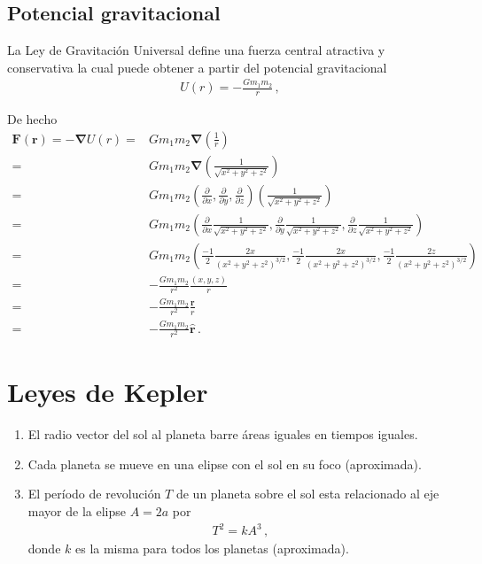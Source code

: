 \subsection{Potencial gravitacional}
\begin{frame}
La Ley de Gravitación Universal define una fuerza central atractiva y conservativa la cual puede obtener a partir del potencial gravitacional
\begin{align*}
  U(r)=-\frac{Gm_1m_2}{r}\,,
\end{align*}
\end{frame}

De hecho 
\begin{align*}
\mathbf{F}(\mathbf{r})=-\boldsymbol{\nabla}U(r)
=&Gm_1m_2\boldsymbol{\nabla}\left(\frac{1}{r}\right)\nonumber\\
=&Gm_1m_2\boldsymbol{\nabla}\left(\frac{1}{\sqrt{x^2+y^2+z^2}}\right)\nonumber\\
=&Gm_1m_2\left(\frac{\partial}{\partial x},\frac{\partial}{\partial y},\frac{\partial}{\partial z}\right)\left(\frac{1}{\sqrt{x^2+y^2+z^2}}\right)\nonumber\\
=&Gm_1m_2\left(\frac{\partial}{\partial x}\frac{1}{\sqrt{x^2+y^2+z^2}},\frac{\partial}{\partial y}\frac{1}{\sqrt{x^2+y^2+z^2}},\frac{\partial}{\partial z}\frac{1}{\sqrt{x^2+y^2+z^2}}\right)\nonumber\\
=&Gm_1m_2\left(\frac{-1}{2}\frac{2x}{(x^2+y^2+z^2)^{3/2}},\frac{-1}{2}\frac{2x}{(x^2+y^2+z^2)^{3/2}},\frac{-1}{2}\frac{2z}{(x^2+y^2+z^2)^{3/2}}\right)\nonumber\\
=&-\frac{Gm_1m_2}{r^2}\frac{(x,y,z)}{r}\nonumber\\
=&-\frac{Gm_1m_2}{r^2}\frac{\mathbf{r}}{r}\nonumber\\
=&-\frac{Gm_1m_2}{r^2}\hat{\mathbf{r}}\,.
\end{align*}


\section{Leyes de Kepler}

\begin{frame}
\begin{enumerate}
\item El radio vector del sol al planeta barre áreas iguales en tiempos iguales.
\item Cada planeta se mueve en una elipse con el sol en su foco (aproximada).
\label{item:6}
\item El período de revolución $T$ de un planeta sobre el sol esta relacionado al eje mayor de la elipse $A=2a$ por
  \begin{align}
    T^2=k A^3\,,
  \end{align}
donde $k$ es la misma para todos los planetas (aproximada).
\label{item:7}
\end{enumerate}
\end{frame}


